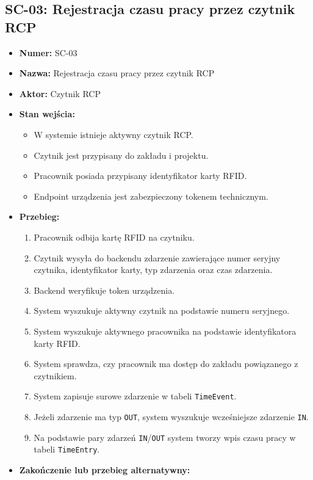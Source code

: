 \subsection{SC-03: Rejestracja czasu pracy przez czytnik RCP}
\begin{itemize}
    \item \textbf{Numer:} SC-03
    \item \textbf{Nazwa:} Rejestracja czasu pracy przez czytnik RCP
    \item \textbf{Aktor:} Czytnik RCP
    \item \textbf{Stan wejścia:}
    \begin{itemize}
        \item W systemie istnieje aktywny czytnik RCP.
        \item Czytnik jest przypisany do zakładu i projektu.
        \item Pracownik posiada przypisany identyfikator karty RFID.
        \item Endpoint urządzenia jest zabezpieczony tokenem technicznym.
    \end{itemize}
    \item \textbf{Przebieg:}
    \begin{enumerate}
        \item Pracownik odbija kartę RFID na czytniku.
        \item Czytnik wysyła do backendu zdarzenie zawierające numer seryjny czytnika, identyfikator karty, typ zdarzenia oraz czas zdarzenia.
        \item Backend weryfikuje token urządzenia.
        \item System wyszukuje aktywny czytnik na podstawie numeru seryjnego.
        \item System wyszukuje aktywnego pracownika na podstawie identyfikatora karty RFID.
        \item System sprawdza, czy pracownik ma dostęp do zakładu powiązanego z czytnikiem.
        \item System zapisuje surowe zdarzenie w tabeli \texttt{TimeEvent}.
        \item Jeżeli zdarzenie ma typ \texttt{OUT}, system wyszukuje wcześniejsze zdarzenie \texttt{IN}.
        \item Na podstawie pary zdarzeń \texttt{IN}/\texttt{OUT} system tworzy wpis czasu pracy w tabeli \texttt{TimeEntry}.
    \end{enumerate}
    \item \textbf{Zakończenie lub przebieg alternatywny:}

\end{itemize}

